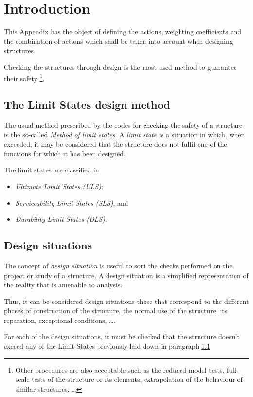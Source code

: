 \section{Introduction}
This Appendix has the object of defining the actions, weighting coefficients and the combination of actions which shall be taken into account when designing structures.

Checking the structures through design is the most used method to guarantee their safety \footnote{Other procedures are also acceptable such as the reduced model tests, full-scale tests of the structure or its elements, extrapolation of the behaviour of similar structures, \ldots}.

\subsection{The Limit States design method} \label{limit_states_introd}
The usual method prescribed by the codes for checking the safety of a structure is the so-called \emph{Method of limit states}. A \emph{limit state} is a situation in which, when exceeded, it may be considered that the structure does not fulfil one of the functions for which it has been designed.

The limit states are classified in:
\begin{itemize}
\item \emph{Ultimate Limit States (ULS)};
\item \emph{Serviceability Limit States (SLS)}, and
\item \emph{Durability Limit States (DLS)}.
\end{itemize}

\subsection{Design situations}
The concept of \emph{design situation} is useful to sort the checks performed on the project or study of a structure. A design situation is a simplified representation of the reality that is amenable to analysis.

Thus, it can be considered design situations those that correspond to the different phases of construction of the structure, the normal use of the structure, its reparation, exceptional conditions, \ldots. 

For each of the design situations, it must be checked that the structure doesn't exceed any of the Limit States previously laid down in paragraph \ref{limit_states_introd}

